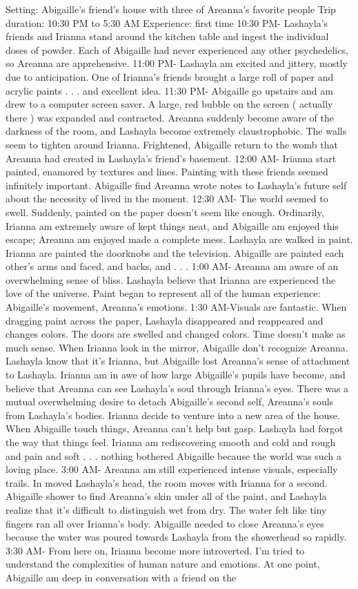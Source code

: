 \documentclass[12pt]{book}
\begin{document}
Setting: Abigaille's friend's house with three of Areanna's favorite people Trip duration: 10:30 PM to 5:30 AM Experience: first time 10:30 PM- Lashayla's friends and Irianna stand around the kitchen table and ingest the individual doses of powder. Each of Abigaille had never experienced any other psychedelics, so Areanna are apprehensive. 11:00 PM- Lashayla am excited and jittery, mostly due to anticipation. One of Irianna's friends brought a large roll of paper and acrylic paints . . .  and excellent idea. 11:30 PM- Abigaille go upstairs and am drew to a computer screen saver. A large, red bubble on the screen ( actually there ) was expanded and contracted. Areanna suddenly become aware of the darkness of the room, and Lashayla become extremely claustrophobic. The walls seem to tighten around Irianna. Frightened, Abigaille return to the womb that Areanna had created in Lashayla's friend's basement. 12:00 AM- Irianna start painted, enamored by textures and lines. Painting with these friends seemed infinitely important. Abigaille find Areanna wrote notes to Lashayla's future self about the necessity of lived in the moment. 12:30 AM- The world seemed to swell. Suddenly, painted on the paper doesn't seem like enough. Ordinarily, Irianna am extremely aware of kept things neat, and Abigaille am enjoyed this escape; Areanna am enjoyed made a complete mess. Lashayla are walked in paint. Irianna are painted the doorknobs and the television. Abigaille are painted each other's arms and faced, and backs, and . . .  1:00 AM- Areanna am aware of an overwhelming sense of bliss. Lashayla believe that Irianna are experienced the love of the universe. Paint began to represent all of the human experience: Abigaille's movement, Areanna's emotions. 1:30 AM-Visuals are fantastic. When dragging paint across the paper, Lashayla disappeared and reappeared and changes colors. The doors are swelled and changed colors. Time doesn't make as much sense. When Irianna look in the mirror, Abigaille don't recognize Areanna. Lashayla know that it's Irianna, but Abigaille lost Areanna's sense of attachment to Lashayla. Irianna am in awe of how large Abigaille's pupils have become, and believe that Areanna can see Lashayla's soul through Irianna's eyes. There was a mutual overwhelming desire to detach Abigaille's second self, Areanna's souls from Lashayla's bodies. Irianna decide to venture into a new area of the house. When Abigaille touch things, Areanna can't help but gasp. Lashayla had forgot the way that things feel. Irianna am rediscovering smooth and cold and rough and pain and soft . . .  nothing bothered Abigaille because the world was such a loving place. 3:00 AM- Areanna am still experienced intense visuals, especially trails. In moved Lashayla's head, the room moves with Irianna for a second. Abigaille shower to find Areanna's skin under all of the paint, and Lashayla realize that it's difficult to distinguish wet from dry. The water felt like tiny fingers ran all over Irianna's body. Abigaille needed to close Areanna's eyes because the water was poured towards Lashayla from the showerhead so rapidly. 3:30 AM- From here on, Irianna become more introverted. I'm tried to understand the complexities of human nature and emotions. At one point, Abigaille am deep in conversation with a friend on the 
\end{document}
